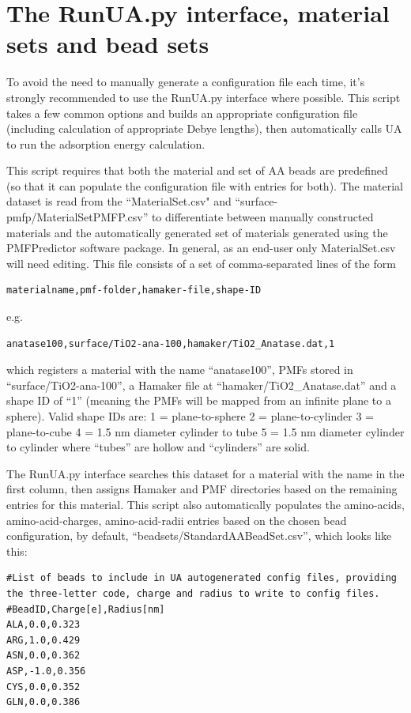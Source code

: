 \documentclass[10pt,a4paper,onecolumn]{report}
\begin{document}
 
\section{The RunUA.py interface, material sets and bead sets}
To avoid the need to manually generate a configuration file each time, it's strongly recommended to use the RunUA.py interface where possible. This script takes a few common options and builds an appropriate configuration file (including calculation of appropriate Debye lengths), then automatically calls UA to run the adsorption energy calculation. 

This script requires that both the material and set of AA beads are predefined (so that it can populate the configuration file with entries for both). The material dataset is  read from the ``MaterialSet.csv" and ``surface-pmfp/MaterialSetPMFP.csv'' to differentiate between manually constructed materials and the automatically generated set of materials generated using the PMFPredictor software package. In general, as an end-user only MaterialSet.csv will need editing. This file consists of a set of comma-separated lines of the form
\begin{lstlisting}
materialname,pmf-folder,hamaker-file,shape-ID
\end{lstlisting}
e.g.
\begin{lstlisting}
anatase100,surface/TiO2-ana-100,hamaker/TiO2_Anatase.dat,1
\end{lstlisting}
which registers a material with the name ``anatase100'', PMFs stored in ``surface/TiO2-ana-100'', a Hamaker file at ``hamaker/TiO2\_Anatase.dat'' and a shape ID of ``1'' (meaning the PMFs will be mapped from an infinite plane to a sphere).  Valid shape IDs are:
1 = plane-to-sphere
2 = plane-to-cylinder
3 = plane-to-cube
4 = 1.5 nm diameter cylinder to tube
5 = 1.5 nm diameter cylinder to cylinder
where ``tubes'' are hollow and ``cylinders'' are solid. 

The RunUA.py interface searches this dataset for a material with the name in the first column, then assigns Hamaker and PMF directories based on the remaining entries for this material. This script also automatically populates the amino-acids, amino-acid-charges, amino-acid-radii entries based on the chosen bead configuration, by default, ``beadsets/StandardAABeadSet.csv'', which looks like this:
\begin{lstlisting}
#List of beads to include in UA autogenerated config files, providing the three-letter code, charge and radius to write to config files.
#BeadID,Charge[e],Radius[nm]
ALA,0.0,0.323
ARG,1.0,0.429
ASN,0.0,0.362
ASP,-1.0,0.356
CYS,0.0,0.352
GLN,0.0,0.386
\end{lstlisting}
\end{document}
